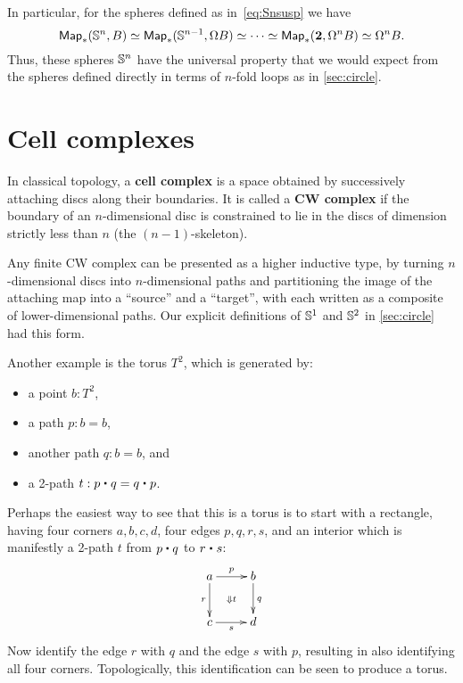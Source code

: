 In particular, for the spheres defined as in~\eqref{eq:Snsusp} we have
\[ \mathsf{Map}_*(\mathbb{S}^n,B) \simeq \mathsf{Map}_*(\mathbb{S}^{n-1}, \Omega B) \simeq \cdots \simeq \mathsf{Map}_*(\mathbf{2},\Omega^n B) \simeq \Omega^n B. \]
Thus, these spheres $\mathbb{S}^n$ have the universal property that we would expect from the spheres defined directly in terms of $n$-fold loops as in \autoref{sec:circle}.


\section{Cell complexes}
\label{sec:cell-complexes}

In classical topology, a \textbf{cell complex} is a space obtained by successively attaching discs along their boundaries.
It is called a \textbf{CW complex} if the boundary of an $n$-dimensional disc is constrained to lie in the discs of dimension strictly less than $n$ (the $(n-1)$-skeleton).

Any finite CW complex can be presented as a higher inductive type, by turning $n$-dimensional discs into $n$-dimensional paths and partitioning the image of the attaching map into a ``source'' and a ``target'', with each written as a composite of lower-dimensional paths.
Our explicit definitions of $\mathbb{S}^1$ and $\mathbb{S}^2$ in \autoref{sec:circle} had this form.

Another example is the torus $T^2$, which is generated by:
\begin{itemize}
\item a point $b:T^2$,
\item a path $p:b=b$,
\item another path $q:b=b$, and
\item a 2-path $t: p\ct q = q \ct p$.
\end{itemize}
Perhaps the easiest way to see that this is a torus is to start with a rectangle, having four corners $a,b,c,d$, four edges $p,q,r,s$, and an interior which is manifestly a 2-path $t$ from $p\ct q$ to $r\ct s$:
\begin{equation*}
  \vcenter{\xymatrix{
      a\ar[r]^p\ar[d]_r \ar@{}[dr]|{\Downarrow t} &
      b\ar[d]^q\\
      c\ar[r]_s &
      d
      }}
\end{equation*}
Now identify the edge $r$ with $q$ and the edge $s$ with $p$, resulting in also identifying all four corners.
Topologically, this identification can be seen to produce a torus.

